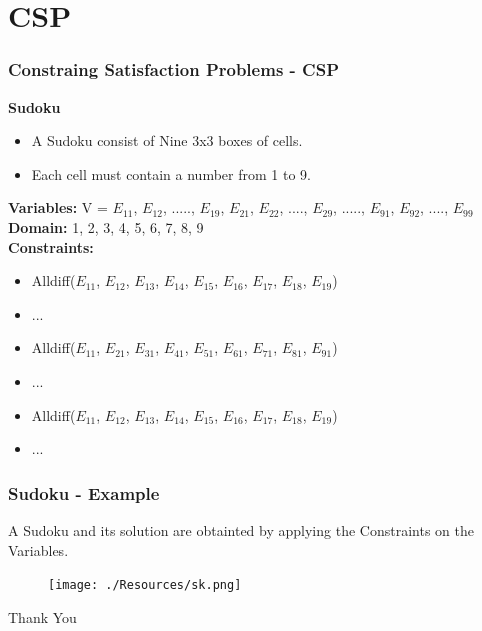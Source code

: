\documentclass[xcolor=table]{beamer}
\begin{document}
\section*{CSP}
\begin{frame}
  \frametitle{Constraing Satisfaction Problems - CSP}
  \textbf{Sudoku}
  \begin{itemize}
    \item A Sudoku consist of Nine 3x3 boxes of cells.
    \item Each cell must contain a number from 1 to 9.
  \end{itemize} 
  \textbf{Variables: } V = {$E_{11}$, $E_{12}$, ....., $E_{19}$, $E_{21}$, $E_{22}$, ...., $E_{29}$, ....., $E_{91}$, $E_{92}$, ...., $E_{99}$}\\
  \textbf{Domain: } {1, 2, 3, 4, 5, 6, 7, 8, 9}\\
  \textbf{Constraints: }
  \begin{itemize}
    \item Alldiff($E_{11}$, $E_{12}$, $E_{13}$, $E_{14}$, $E_{15}$, $E_{16}$, $E_{17}$, $E_{18}$, $E_{19}$)
    \item ...
    \item Alldiff($E_{11}$, $E_{21}$, $E_{31}$, $E_{41}$, $E_{51}$, $E_{61}$, $E_{71}$, $E_{81}$, $E_{91}$)
    \item ...
    \item Alldiff($E_{11}$, $E_{12}$, $E_{13}$, $E_{14}$, $E_{15}$, $E_{16}$, $E_{17}$, $E_{18}$, $E_{19}$)
    \item ...
  \end{itemize}
\end{frame}

\begin{frame}
  \frametitle{Sudoku - Example}
\quad A Sudoku and its solution are obtainted by applying the Constraints on the Variables.
\begin{figure}[H]
  \centering
  \texttt{[image: ./Resources/sk.png]}
\end{figure}
  

\end{frame}

\begin{frame}
  \begin{center}
    \Huge
    Thank You
  \end{center}
\end{frame}
\end{document}
